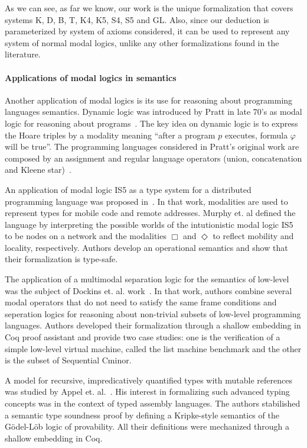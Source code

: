 \documentclass[sigconf]{acmart}
\begin{document}
As we can see, as far we know, our work is the unique formalization that covers systems
K, D, B, T, K4, K5, S4, S5 and GL. Also, since our deduction is
parameterized by system of axioms considered, it can be used to represent any
system of normal modal logics, unlike any other formalizations found in the literature.

\paragraph{Applications of modal logics in semantics} Another application of
modal logics is its use for reasoning about programming languages semantics.
Dynamic logic was introduced by Pratt in late 70's as modal logic for reasoning
about programs~\cite{Pratt76,Pratt80}. The key idea on dynamic logic is to express the
Hoare triples by a modality meaning ``after a program $p$ executes, formula
$\varphi$ will be true''. The programming languages considered in Pratt's
original work are composed by an assignment and regular language operators
(union, concatenation and Kleene star)~\cite{Pratt76}.

An application of modal logic IS5 as a type system for a distributed
programming language was proposed in~\cite{Murphy04}. 
In that work, modalities are used to represent types for mobile code
and remote addresses. Murphy et. al defined the language by interpreting
the possible worlds of the intutionistic modal logic IS5 to be nodes on a
network and the modalities $\Box$ and $\Diamond$ to reflect mobility and
locality, respectively. Authors develop an operational semantics and show
that their formalization is type-safe.

The application of a multimodal separation logic for the semantics of low-level
was the subject of Dockins et. al. work~\cite{Dockins08}. In that work, authors
combine several modal operators that do not need to satisfy the same frame
conditions and seperation logics for reasoning about non-trivial subsets of
low-level programming languages. Authors developed their formalization through a
shallow embedding in Coq proof assistant and provide two case studies: one is
the verification of a simple low-level virtual machine, called the list machine
benchmark and the other is the subset of Sequential Cminor.

A model for recursive, impredicatively quantified types with mutable references
was studied by Appel et. al.~\cite{Appel07}. His interest in formalizing such
advanced typing concepts was in the context of typed assembly languages.
The authors stabilished a semantic type soundness proof by defining a Kripke-style 
semantics of the G\"odel-L\"ob logic of provability. All their definitions were
mechanized through a shallow embedding in Coq.
\end{document}
